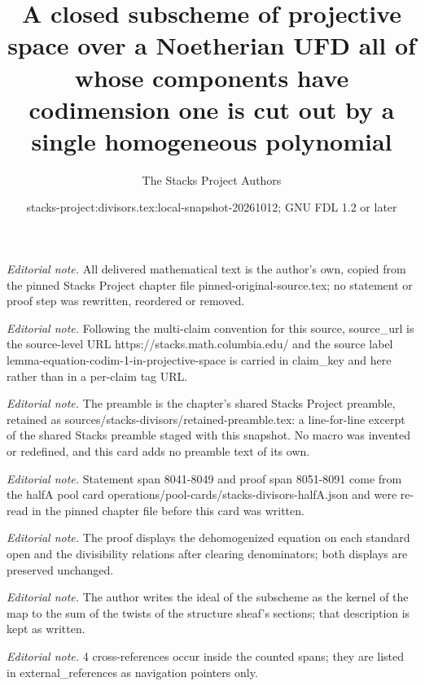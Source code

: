 \documentclass[10pt,a4paper]{amsart}
\title{A closed subscheme of projective space over a Noetherian UFD all of whose components have codimension one is cut out by a single homogeneous polynomial}
\author{The Stacks Project Authors}
\date{stacks-project:divisors.tex:local-snapshot-20261012; GNU FDL 1.2 or later}
\theoremstyle{plain}
\theoremstyle{definition}
\theoremstyle{remark}
\numberwithin{equation}{subsection}
\begin{document}
\maketitle
\noindent\textit{Editorial note.} All delivered mathematical text is the author's own, copied from the pinned Stacks Project chapter file pinned-original-source.tex; no statement or proof step was rewritten, reordered or removed.\par\medskip
\noindent\textit{Editorial note.} Following the multi-claim convention for this source, source\_url is the source-level URL https://stacks.math.columbia.edu/ and the source label lemma-equation-codim-1-in-projective-space is carried in claim\_key and here rather than in a per-claim tag URL.\par\medskip
\noindent\textit{Editorial note.} The preamble is the chapter's shared Stacks Project preamble, retained as sources/stacks-divisors/retained-preamble.tex: a line-for-line excerpt of the shared Stacks preamble staged with this snapshot. No macro was invented or redefined, and this card adds no preamble text of its own.\par\medskip
\noindent\textit{Editorial note.} Statement span 8041-8049 and proof span 8051-8091 come from the halfA pool card operations/pool-cards/stacks-divisors-halfA.json and were re-read in the pinned chapter file before this card was written.\par\medskip
\noindent\textit{Editorial note.} The proof displays the dehomogenized equation on each standard open and the divisibility relations after clearing denominators; both displays are preserved unchanged.\par\medskip
\noindent\textit{Editorial note.} The author writes the ideal of the subscheme as the kernel of the map to the sum of the twists of the structure sheaf's sections; that description is kept as written.\par\medskip
\noindent\textit{Editorial note.} 4 cross-references occur inside the counted spans; they are listed in external\_references as navigation pointers only.\par\medskip
\end{document}
